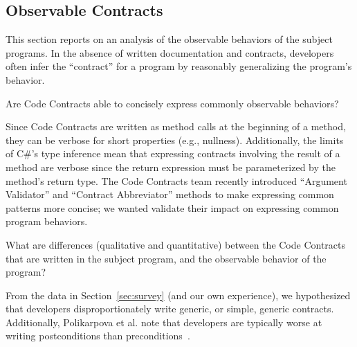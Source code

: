 
\subsection{Observable Contracts}
\label{sec:celeriac}

This section reports on an analysis of the observable behaviors
of the subject programs.
%
In the absence of written documentation and contracts, developers
often infer the ``contract'' for a program by reasonably generalizing
the program's behavior.




\begin{research-question}
  Are Code Contracts able to concisely express commonly observable
  behaviors?
\end{research-question}

Since Code Contracts are written as method calls at the beginning of
a method, they can be verbose for short properties (e.g.,
nullness). Additionally, the limits of C\#'s type inference mean that
expressing contracts involving the result of a method are verbose
since the return expression must be parameterized by the method's
return type.
%
The Code Contracts team recently introduced ``Argument Validator'' and
``Contract Abbreviator'' methods to make expressing common patterns
more concise; we wanted validate their impact on expressing common
program behaviors.

\begin{research-question}
  What are differences (qualitative and quantitative) between the Code
  Contracts that are written in the subject program, and the observable
  behavior of the program?
\end{research-question}

From the data in Section~\ref{sec:survey} (and our own experience), we
hypothesized that developers disproportionately write generic, or
simple, generic contracts. Additionally, Polikarpova et al. note that
developers are typically worse at writing postconditions than
preconditions~\cite{Polikarpova2012}.

